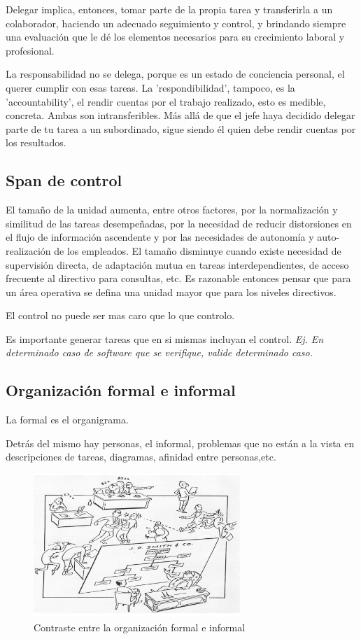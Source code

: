 \documentclass[titlepage,a4paper]{article}
\begin{document}
Delegar implica, entonces, tomar parte de la propia tarea y transferirla a un colaborador, haciendo un adecuado seguimiento y control, y brindando siempre una evaluación que le dé los elementos necesarios para su crecimiento laboral y profesional.

La responsabilidad no se delega, porque es un estado de conciencia personal, el querer cumplir con esas tareas. La 'respondibilidad', tampoco, es la 'accountability', el rendir cuentas por el trabajo realizado, esto es medible, concreta. Ambas son intransferibles. Más allá de que el jefe haya decidido delegar parte de tu tarea a un subordinado, sigue siendo él quien debe rendir cuentas por los resultados.


\subsection{Span de control}

El tamaño de la unidad aumenta, entre otros factores, por la normalización y similitud de las tareas desempeñadas, por la necesidad de reducir distorsiones en el flujo de información ascendente y por las necesidades de autonomía y auto-realización de los empleados. El tamaño disminuye cuando existe necesidad de supervisión directa, de adaptación mutua en tareas interdependientes, de acceso frecuente al directivo para consultas, etc. Es razonable entonces pensar que para un área operativa se defina una unidad mayor que para los niveles directivos.

El control no puede ser mas caro que lo que controlo.

Es importante generar tareas que en si mismas incluyan el control. \textit{Ej. En determinado caso de software que se verifique, valide determinado caso.}

\subsection{Organización formal e informal}
La formal es el organigrama.

Detrás del mismo hay personas, el informal, problemas que no están a la vista en descripciones de tareas, diagramas, afinidad entre personas,etc.

\begin{figure}[!htb]
    \centering
    \includegraphics[width=0.7\textwidth]{imagenes/OrganizacionFormalInformal.PNG}
    \caption{Contraste entre la organización formal e informal}
\end{figure}
\end{document}
